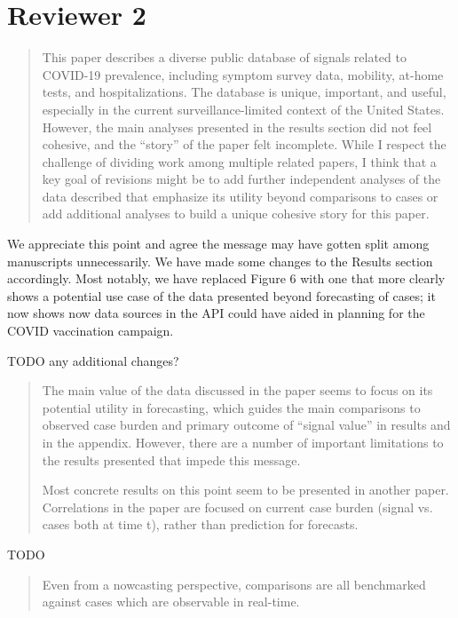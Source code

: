 \documentclass[11pt]{article}
\begin{document}
\section*{Reviewer 2}

\begin{quote}
  This paper describes a diverse public database of signals related to COVID-19
  prevalence, including symptom survey data, mobility, at-home tests, and
  hospitalizations. The database is unique, important, and useful, especially in
  the current surveillance-limited context of the United States. However, the
  main analyses presented in the results section did not feel cohesive, and the
  ``story'' of the paper felt incomplete. While I respect the challenge of
  dividing work among multiple related papers, I think that a key goal of
  revisions might be to add further independent analyses of the data described
  that emphasize its utility beyond comparisons to cases or add additional
  analyses to build a unique cohesive story for this paper.
\end{quote}

We appreciate this point and agree the message may have gotten split among
manuscripts unnecessarily. We have made some changes to the Results section
accordingly. Most notably, we have replaced Figure 6 with one that more clearly
shows a potential use case of the data presented beyond forecasting of cases; it
now shows now data sources in the API could have aided in planning for the COVID
vaccination campaign.

TODO any additional changes?

\begin{quote}
  The main value of the data discussed in the paper seems to focus on its
  potential utility in forecasting, which guides the main comparisons to
  observed case burden and primary outcome of ``signal value'' in results and in
  the appendix. However, there are a number of important limitations to the
  results presented that impede this message.

  Most concrete results on this point seem to be presented in another paper.
  Correlations in the paper are focused on current case burden (signal vs. cases
  both at time t), rather than prediction for forecasts.
\end{quote}

TODO

\begin{quote}
  Even from a nowcasting perspective, comparisons are all benchmarked against
  cases which are observable in real-time.
\end{quote}
\end{document}

